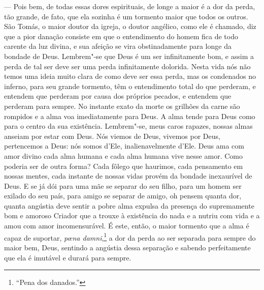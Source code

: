  --- Pois bem, de todas essas dores espirituais, de longe a maior é a dor
da perda, tão grande, de fato, que ela sozinha é um tormento maior que
todos os outros. São Tomás, o maior doutor da igreja,  o doutor
angélico, como ele é chamado, diz que a pior danação consiste em que o
entendimento do homem fica de todo carente da luz divina, e sua afeição
se vira obstinadamente para longe da bondade de Deus. Lembrem"-se que
Deus é um ser infinitamente bom, e assim a perda de tal ser deve ser
uma perda infinitamente dolorida. Nesta vida nós não temos uma ideia
muito clara de como deve ser essa perda, mas os condenados no inferno,
para seu grande tormento, têm o entendimento total do que perderam, e
entendem que perderam por causa dos próprios pecados, e entendem que
perderam para sempre. No instante exato da morte os grilhões da carne
são rompidos e a alma voa imediatamente para Deus. A alma tende para
Deus como para o centro da sua existência. Lembrem"-se, meus caros
rapazes, nossas almas anseiam por estar com Deus. Nós viemos de Deus,
vivemos por Deus, pertencemos a Deus: nós somos d’Ele,
inalienavelmente d’Ele. Deus ama com amor divino cada alma humana e
cada alma humana vive nesse amor. Como poderia ser de outra forma? Cada
fôlego que haurimos, cada pensamento em nossas mentes, cada instante de
nossas vidas provém da bondade inexaurível de Deus. E se já dói para
uma mãe se separar do seu filho, para um homem ser exilado do seu país,
para amigo se separar de amigo, oh pensem quanta dor, quanta angústia
deve sentir a pobre alma expulsa da presença do supremamente bom e
amoroso Criador que a trouxe à existência do nada e a nutriu com vida e
a amou com amor incomensurável. É este, então, o maior tormento que a
alma é capaz de suportar, \textit{pœna damni},\footnote{ ``Pena dos danados.''} 
a dor da perda ao ser separada para sempre do maior bem, Deus, sentindo a angústia dessa
separação e sabendo perfeitamente que ela é imutável e durará para
sempre.

